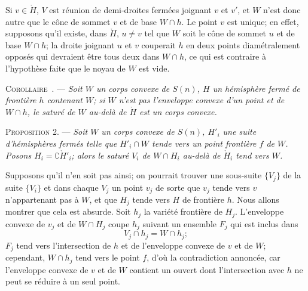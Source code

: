 \documentclass[11pt]{article}
\newcommand{\bznum}[1]{\if\relax\detokenize{#1}\relax\else\ #1\fi}
\newenvironment{prop}[1][]{\par\medskip\noindent\textsc{Proposition #1.} --- \itshape}{\par\medskip}
\newenvironment{corollaire}[1][]{\par\medskip\noindent\textsc{Corollaire\bznum{#1}.} --- \itshape}{\par\medskip}
\newenvironment{proof}[1][]{\par}{\par}
\begin{document}
\begin{proof}
Si $v\in\mathring{H}$, $V$ est réunion de demi-droites fermées joignant $v$ et $v'$, et $W$ n'est
donc autre que le cône de sommet $v$ et de base $W\cap h$. Le point $v$ est unique; en effet,
supposons qu'il existe, dans $\mathring{H}$, $u\neq v$ tel que $W$ soit le cône de sommet $u$ et
de base $W\cap h$; la droite joignant $u$ et $v$ couperait $h$ en deux points diamétralement
opposés qui devraient être tous deux dans $W\cap h$, ce qui est contraire à l'hypothèse faite que
le noyau de $W$ est vide.
\end{proof}

\begin{corollaire}
Soit $W$ un corps convexe de $S(n)$, $H$ un hémisphère fermé de frontière $h$ contenant $W$; si
$W$ n'est pas l'enveloppe convexe d'un point et de $W\cap h$, le saturé de $W$ au-delà de
$\mathring{H}$ est un corps convexe.
\end{corollaire}

\begin{prop}[2]
Soit $W$ un corps convexe de $S(n)$, $H'_i$ une suite d'hémisphères fermés telle que $H'_i\cap W$
tende vers un point frontière $f$ de $W$. Posons $H_i=\complement\mathring{H}'_i$; alors le saturé
$V_i$ de $W\cap H_i$ au-delà de $\mathring{H}_i$ tend vers $W$.
\end{prop}

\begin{proof}
Supposons qu'il n'en soit pas ainsi; on pourrait trouver une sous-suite $\{V_j\}$ de la suite
$\{V_i\}$ et dans chaque $V_j$ un point $v_j$ de sorte que $v_j$ tende vers $v$ n'appartenant pas
à $W$, et que $H_j$ tende vers $H$ de frontière $h$. Nous allons montrer que cela est absurde. Soit
$h_j$ la variété frontière de $H_j$. L'enveloppe convexe de $v_j$ et de $W\cap H_j$ coupe $h_j$
suivant un ensemble $F_j$ qui est inclus dans
\[ V_j\cap h_j=W\cap h_j; \]
$F_j$ tend vers l'intersection de $h$ et de l'enveloppe convexe de $v$ et de $W$; cependant,
$W\cap h_j$ tend vers le point $f$, d'où la contradiction annoncée, car l'enveloppe convexe de $v$
et de $W$ contient un ouvert dont l'intersection avec $h$ ne peut se réduire à un seul point.
\end{proof}
\end{document}
